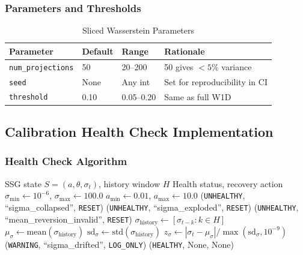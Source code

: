 \subsubsection{Parameters and Thresholds}

\begin{table}[htbp]
\centering
\caption{Sliced Wasserstein Parameters}
\begin{tabular}{l l l l}
\toprule
\textbf{Parameter} & \textbf{Default} & \textbf{Range} & \textbf{Rationale} \\
\midrule
\texttt{num\_projections} & 50 & 20--200 & 50 gives $<5\%$ variance \\
\texttt{seed} & None & Any int & Set for reproducibility in CI \\
\texttt{threshold} & 0.10 & 0.05--0.20 & Same as full W1D \\
\bottomrule
\end{tabular}
\end{table}

\subsection{Calibration Health Check Implementation}
\label{sec:calibration-health-impl}

\subsubsection{Health Check Algorithm}

\begin{algorithm}[H]
\caption{SSG Calibration Health Check}
\label{alg:calibration-health}
\begin{algorithmic}[1]
\Require SSG state $S = (a, \theta, \sigma_t)$, history window $H$
\Ensure Health status, recovery action
\State $\sigma_{\min} \gets 10^{-6}$, $\sigma_{\max} \gets 100.0$
\State $a_{\min} \gets 0.01$, $a_{\max} \gets 10.0$
    \State \Return (\texttt{UNHEALTHY}, ``sigma\_collapsed'', \texttt{RESET})
\EndIf
{}
    \State \Return (\texttt{UNHEALTHY}, ``sigma\_exploded'', \texttt{RESET})
\EndIf
{}
    \State \Return (\texttt{UNHEALTHY}, ``mean\_reversion\_invalid'', \texttt{RESET})
\EndIf
\State $\sigma_{\text{history}} \gets [\sigma_{t-k} : k \in H]$ 
\State $\mu_\sigma \gets \text{mean}(\sigma_{\text{history}})$
\State $\text{sd}_\sigma \gets \text{std}(\sigma_{\text{history}})$
\State $z_\sigma \gets |\sigma_t - \mu_\sigma| / \max(\text{sd}_\sigma, 10^{-9})$
    \State \Return (\texttt{WARNING}, ``sigma\_drifted'', \texttt{LOG\_ONLY})
\EndIf
\State \Return (\texttt{HEALTHY}, None, None)
\end{algorithmic}
\end{algorithm}

